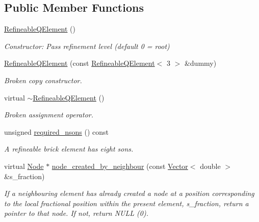 \subsection*{Public Member Functions}
\begin{DoxyCompactItemize}
\item 
\hyperlink{classoomph_1_1RefineableQElement_3_013_01_4_afebcbfcb8c222f8912043b0c9513a945}{Refineable\+Q\+Element} ()
\begin{DoxyCompactList}\small\item\em Constructor\+: Pass refinement level (default 0 = root) \end{DoxyCompactList}\item 
\hyperlink{classoomph_1_1RefineableQElement_3_013_01_4_a3357a1cd5bb746a97973ee6019e5bd04}{Refineable\+Q\+Element} (const \hyperlink{classoomph_1_1RefineableQElement}{Refineable\+Q\+Element}$<$ 3 $>$ \&dummy)
\begin{DoxyCompactList}\small\item\em Broken copy constructor. \end{DoxyCompactList}\item 
virtual \hyperlink{classoomph_1_1RefineableQElement_3_013_01_4_abbdc6a7895845fd7a30ecc5b35be2764}{$\sim$\+Refineable\+Q\+Element} ()
\begin{DoxyCompactList}\small\item\em Broken assignment operator. \end{DoxyCompactList}\item 
unsigned \hyperlink{classoomph_1_1RefineableQElement_3_013_01_4_a1eff24cfc9bead67647d7df95dad97c8}{required\+\_\+nsons} () const
\begin{DoxyCompactList}\small\item\em A refineable brick element has eight sons. \end{DoxyCompactList}\item 
virtual \hyperlink{classoomph_1_1Node}{Node} $\ast$ \hyperlink{classoomph_1_1RefineableQElement_3_013_01_4_a3651ba128941c12c7da6521ae82af8ff}{node\+\_\+created\+\_\+by\+\_\+neighbour} (const \hyperlink{classoomph_1_1Vector}{Vector}$<$ double $>$ \&s\+\_\+fraction)
\begin{DoxyCompactList}\small\item\em If a neighbouring element has already created a node at a position corresponding to the local fractional position within the present element, s\+\_\+fraction, return a pointer to that node. If not, return N\+U\+LL (0). \end{DoxyCompactList}\item 

\end{DoxyCompactItemize}
